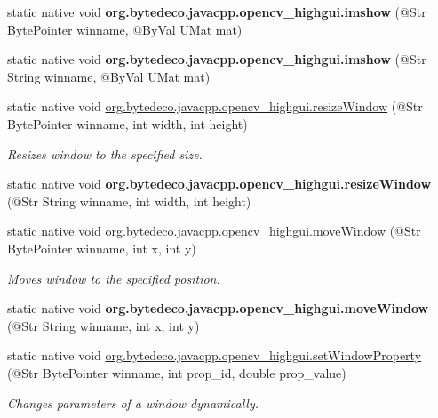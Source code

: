 \begin{DoxyCompactItemize}
static native void {\bfseries org.\+bytedeco.\+javacpp.\+opencv\+\_\+highgui.\+imshow} (@Str Byte\+Pointer winname, @By\+Val U\+Mat mat)
\item 
\mbox{\label{group__highgui_gabdd78f5e2e26ddbc85af2d2a1eead0af}} 
static native void {\bfseries org.\+bytedeco.\+javacpp.\+opencv\+\_\+highgui.\+imshow} (@Str String winname, @By\+Val U\+Mat mat)
\item 
static native void \hyperlink{group__highgui_ga4e805fd30f0df6fd2b5715cf89f4f80e}{org.\+bytedeco.\+javacpp.\+opencv\+\_\+highgui.\+resize\+Window} (@Str Byte\+Pointer winname, int width, int height)
\begin{DoxyCompactList}\small\item\em Resizes window to the specified size. \end{DoxyCompactList}\item 
\mbox{\label{group__highgui_gaf05876a5e8af8a3c1be4e01f1803e599}} 
static native void {\bfseries org.\+bytedeco.\+javacpp.\+opencv\+\_\+highgui.\+resize\+Window} (@Str String winname, int width, int height)
\item 
static native void \hyperlink{group__highgui_ga7731f7680d8bb28a3e069616f3395907}{org.\+bytedeco.\+javacpp.\+opencv\+\_\+highgui.\+move\+Window} (@Str Byte\+Pointer winname, int x, int y)
\begin{DoxyCompactList}\small\item\em Moves window to the specified position. \end{DoxyCompactList}\item 
\mbox{\label{group__highgui_ga85bbed8fb73817ab7d744f9ddf2f42f7}} 
static native void {\bfseries org.\+bytedeco.\+javacpp.\+opencv\+\_\+highgui.\+move\+Window} (@Str String winname, int x, int y)
\item 
static native void \hyperlink{group__highgui_ga0c820fdf7575d2e62d3aed900aa534cd}{org.\+bytedeco.\+javacpp.\+opencv\+\_\+highgui.\+set\+Window\+Property} (@Str Byte\+Pointer winname, int prop\+\_\+id, double prop\+\_\+value)
\begin{DoxyCompactList}\small\item\em Changes parameters of a window dynamically. \end{DoxyCompactList}\item 
\mbox{\label{group__highgui_gac198e5bd280f5c0ccab754b8ddbeb1cd}} 

\end{DoxyCompactItemize}
